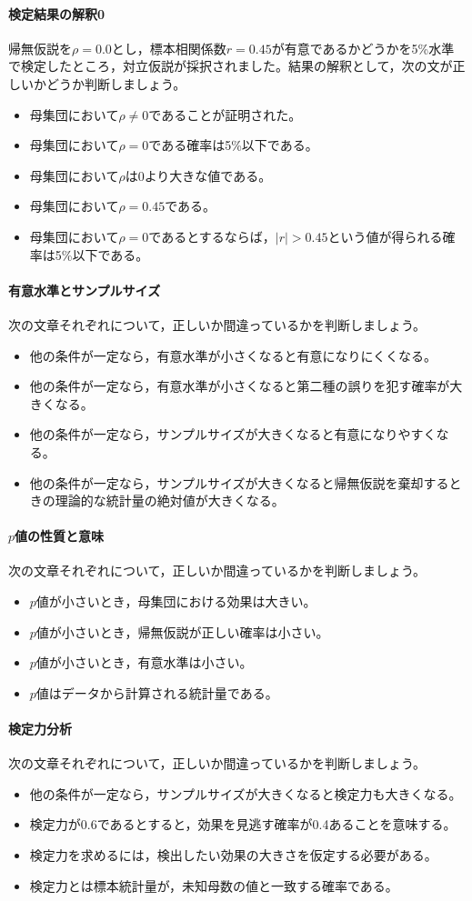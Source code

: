 \documentclass{ltjsbook}
\begin{document}
\paragraph{検定結果の解釈0}帰無仮説を$\rho=0.0$とし，標本相関係数$r=0.45$が有意であるかどうかを5\%水準で検定したところ，対立仮説が採択されました。結果の解釈として，次の文が正しいかどうか判断しましょう。
\begin{itemize}
	\item 母集団において$\rho\neq 0$であることが証明された。
	\item 母集団において$\rho=0$である確率は5\%以下である。
	\item 母集団において$\rho$は0より大きな値である。
	\item 母集団において$\rho=0.45$である。
	\item 母集団において$\rho=0$であるとするならば，$|r|>0.45$という値が得られる確率は5\%以下である。
\end{itemize}

\paragraph{有意水準とサンプルサイズ}次の文章それぞれについて，正しいか間違っているかを判断しましょう。
\begin{itemize}
	\item 他の条件が一定なら，有意水準が小さくなると有意になりにくくなる。
	\item 他の条件が一定なら，有意水準が小さくなると第二種の誤りを犯す確率が大きくなる。
	\item 他の条件が一定なら，サンプルサイズが大きくなると有意になりやすくなる。
	\item 他の条件が一定なら，サンプルサイズが大きくなると帰無仮説を棄却するときの理論的な統計量の絶対値が大きくなる。
\end{itemize}
\paragraph{$p$値の性質と意味}次の文章それぞれについて，正しいか間違っているかを判断しましょう。
\begin{itemize}
	\item $p$値が小さいとき，母集団における効果は大きい。
	\item $p$値が小さいとき，帰無仮説が正しい確率は小さい。
	\item $p$値が小さいとき，有意水準は小さい。
	\item $p$値はデータから計算される統計量である。
\end{itemize}
\paragraph{検定力分析}次の文章それぞれについて，正しいか間違っているかを判断しましょう。
\begin{itemize}
	\item 他の条件が一定なら，サンプルサイズが大きくなると検定力も大きくなる。
	\item 検定力が0.6であるとすると，効果を見逃す確率が0.4あることを意味する。
	\item 検定力を求めるには，検出したい効果の大きさを仮定する必要がある。
	\item 検定力とは標本統計量が，未知母数の値と一致する確率である。
\end{itemize}
\end{document}
